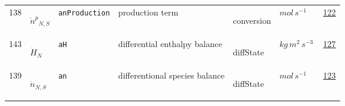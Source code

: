 \begin{longtable}{|p{1cm}|p{2.5cm}|p{4.5cm}|p{8cm}|p{3.0cm}|p{3cm}|p{1cm}|}
            138
             & \hypertarget{"v:138"}{ $ {{\dot{n}^p}}{_{N, S}} $}
             & \verb|anProduction|
             & production term
             & \begin{lay}conversion \end{lay}
             & $ mol \,s^{-1} \, $
             &                 \hyperlink{"e:122"}{ 122 }
                 \\
            143
             & \hypertarget{"v:143"}{ $ {{\dot{H}}}{_{N}} $}
             & \verb|aH|
             & differential enthalpy balance
             & \begin{lay}diffState \end{lay}
             & $ kg \,m^{2} \,s^{-3} \, $
             &                 \hyperlink{"e:127"}{ 127 }
                 \\
            139
             & \hypertarget{"v:139"}{ $ {{\dot{n}}}{_{N, S}} $}
             & \verb|an|
             & differentional species balance
             & \begin{lay}diffState \end{lay}
             & $ mol \,s^{-1} \, $
             &                 \hyperlink{"e:123"}{ 123 }
                 \\
    \end{longtable}